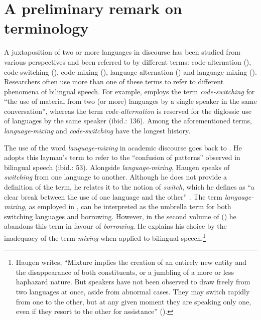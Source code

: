\section{A preliminary remark on terminology}
\label{sec:preliminary}
A juxtaposition of two or more languages in discourse has been studied from various perspectives and been referred to by different terms: code-alternation (\citealt{extra-code-copying-1993,johanson-zum-1999, thomason-language-2001,migge-exploring-2013}), code-switching (\citealt{gumperz-social-1972, poplack-sometimes-1980,myers-scotton-duelling-1993,backus-two-1996}), code-mixing (\citealt{muysken-bilingual-2000,muhamedowa-untersuchung-2006}), language alternation (\citealt{auer-bilingual-1984, maschler-transition-1998}) and language-mixing (\citealt{pfaff-1979, backus-patterns-1992,lanza-language-2004}). Researchers often use more than one of these terms to refer to different phenomena of bilingual speech. For example, \citet[][132]{thomason-language-2001} employs the term \textit{code-switching}  for ``the use of material from two (or more) languages by a single speaker in the same conversation'', whereas the term \textit{code-alternation} is reserved for the diglossic use of languages by the same speaker (ibid.: 136). Among the aforementioned terms, \textit {language-mixing} and \textit {code-switching} have the longest history. 

The use of the word \textit {language-mixing} in academic discourse goes back to \citet[][53]{haugen-1953-vol1}. He adopts this layman's term to refer to the ``confusion of patterns'' observed in bilingual speech (ibid.: 53). Alongside \textit{language-mixing}, Haugen speaks of \textit{switching} from one language to another. Although he does not provide a definition of the term, he relates it to the notion of \textit{switch}, which he defines as ``a clear break between the use of one language and the other'' \citep[65]{haugen-1953-vol1}. The term \textit{language-mixing}, as employed in \citet{haugen-1953-vol1}, can be interpreted as the umbrella term for both switching languages and borrowing. However, in the second volume of  (\citeyear{haugen-1953-vol2}) he abandons this term in favour of \textit{borrowing}. He explains his choice by the inadequacy of the term \textit{mixing} when applied to bilingual speech.\footnote{Haugen writes, ``Mixture implies the creation of an entirely new entity and the disappearance of both constituents, or a jumbling of a more or less haphazard nature. But speakers have not been observed to draw freely from two languages at once, aside from abnormal cases. They may switch rapidly from one to the other, but at any given moment they are speaking only one, even if they resort to the other for assistance'' (\citeyear[362]{haugen-1953-vol2}).}

